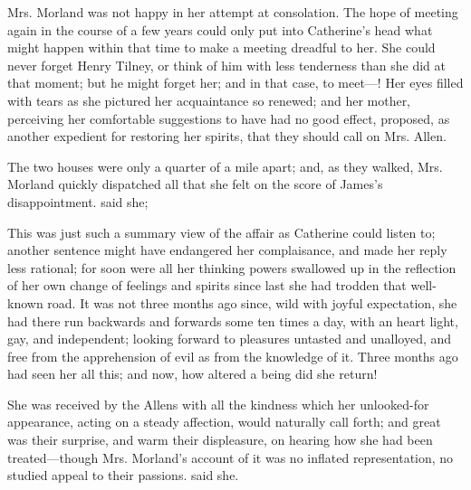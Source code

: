 
Mrs. Morland was not happy in her attempt at consolation. The hope of meeting again in the course of a few years could only put into Catherine's head what might happen within that time to make a meeting dreadful to her. She could never forget Henry Tilney, or think of him with less tenderness than she did at that moment; but he might forget her; and in that case, to meet---! Her eyes filled with tears as she pictured her acquaintance so renewed; and her mother, perceiving her comfortable suggestions to have had no good effect, proposed, as another expedient for restoring her spirits, that they should call on Mrs. Allen.

The two houses were only a quarter of a mile apart; and, as they walked, Mrs. Morland quickly dispatched all that she felt on the score of James's disappointment.  said she; 

This was just such a summary view of the affair as Catherine could listen to; another sentence might have endangered her complaisance, and made her reply less rational; for soon were all her thinking powers swallowed up in the reflection of her own change of feelings and spirits since last she had trodden that well-known road. It was not three months ago since, wild with joyful expectation, she had there run backwards and forwards some ten times a day, with an heart light, gay, and independent; looking forward to pleasures untasted and unalloyed, and free from the apprehension of evil as from the knowledge of it. Three months ago had seen her all this; and now, how altered a being did she return!

She was received by the Allens with all the kindness which her unlooked-for appearance, acting on a steady affection, would naturally call forth; and great was their surprise, and warm their displeasure, on hearing how she had been treated---though Mrs. Morland's account of it was no inflated representation, no studied appeal to their passions.  said she. 

